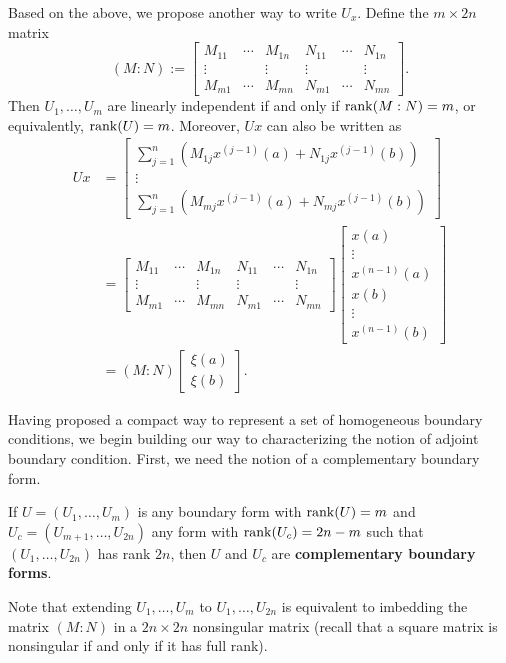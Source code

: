 \documentclass[11pt, oneside, a4paper]{article}
\begin{document}
Based on the above, we propose another way to write $U_x$. Define the $m\times 2n$ matrix
\[(M:N):=\begin{bmatrix}
    M_{11} & \cdots & M_{1n} & N_{11} & \cdots & N_{1n}\\
    \vdots &  & \vdots & \vdots & & \vdots\\
    M_{m1} & \cdots & M_{mn} & N_{m1} & \cdots & N_{mn}
\end{bmatrix}.\]
Then $U_1,\ldots,U_m$ are linearly independent if and only if $\operatorname{rank}(M:N)=m$, or equivalently, $\operatorname{rank}(U)=m$. 
Moreover, $Ux$ can also be written as
\begin{align*}
    Ux &= \begin{bmatrix}
        \sum_{j=1}^n (M_{1j}x^{(j-1)}(a) + N_{1j}x^{(j-1)}(b))\\
        \vdots\\
        \sum_{j=1}^n (M_{mj}x^{(j-1)}(a) + N_{mj}x^{(j-1)}(b))
    \end{bmatrix}\\
    &= \begin{bmatrix}
        M_{11} & \cdots & M_{1n} & N_{11} & \cdots & N_{1n}\\
        \vdots &  & \vdots & \vdots & & \vdots\\
        M_{m1} & \cdots & M_{mn} & N_{m1} & \cdots & N_{mn}
    \end{bmatrix} \begin{bmatrix}x(a)\\\vdots\\x^{(n-1)}(a)\\ x(b)\\\vdots\\x^{(n-1)}(b)\end{bmatrix}\\
    &= (M:N)\begin{bmatrix}
        \xi(a)\\
        \xi(b)
    \end{bmatrix}.
\end{align*}

Having proposed a compact way to represent a set of homogeneous boundary conditions, we begin building our way to characterizing the notion of adjoint boundary condition. First, we need the notion of a complementary boundary form.

\begin{defn}\cite[p.287]{CoddingtonLevinson}\label{defn:complementary boundary form}
    If $U=(U_1,\ldots, U_m)$ is any boundary form with $\operatorname{rank}(U)=m$ and $U_c=(U_{m+1},\ldots,U_{2n})$ any form with $\operatorname{rank}(U_c)=2n-m$ such that $(U_1,\ldots, U_{2n})$ has rank $2n$, then $U$ and $U_c$ are \textbf{complementary boundary forms}. 
    
    Note that extending $U_{1},\ldots, U_{m}$ to $U_1,\ldots,U_{2n}$ is equivalent to imbedding the matrix $(M:N)$ in a $2n\times 2n$ nonsingular matrix (recall that a square matrix is nonsingular if and only if it has full rank).
\end{defn}
\end{document}
